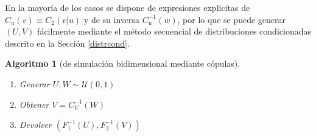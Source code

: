 \documentclass[
  spanish,
  10pt,
]{book}
\theoremstyle{break}
\newtheorem{conjecture}{Algoritmo}[chapter]
\theoremstyle{nonumberplain}
\begin{document}
En la mayoría de los casos se dispone de expresiones explicitas de \(C_{u}(v)\equiv C_2\left( \left.  v\right \vert u\right)\) y de su inversa \(C_{u}^{-1}(w)\), por lo que se puede generar \((U,V)\) fácilmente mediante el método secuencial de distribuciones condicionadas descrito en la Sección \ref{distrcond}.

\begin{conjecture}[de simulación bidimensional mediante cópulas]
\protect\hypertarget{cnj:copula-bidim}{}\label{cnj:copula-bidim}

\begin{enumerate}
\def\labelenumi{\arabic{enumi}.}
\item
  Generar \(U,W\sim \mathcal{U}(0,1)\)
\item
  Obtener \(V=C_{U}^{-1}(W)\)
\item
  Devolver \(\left( F_1^{-1}(U),F_2^{-1}(V)\right)\)
\end{enumerate}

\end{conjecture}
\end{document}
